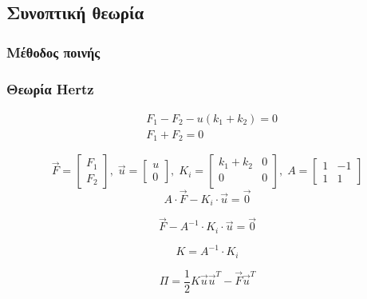 \documentclass{article}
\begin{document}
\subsection{Συνοπτική θεωρία}
\subsubsection{Μέθοδος ποινής}

\subsubsection{Θεωρία Hertz}

\begin{align}
    &F_1-F_2-u(k_1+k_2)=0\\
    &F_1+F_2=0
\end{align}

\begin{equation}
    \vec{F} = \begin{bmatrix}
        F_1\\
        F_2
    \end{bmatrix},\; \vec{u}=\begin{bmatrix}
        u\\
        0
    \end{bmatrix},\; K_i = \begin{bmatrix}
        k_1+k_2 & 0\\
        0 & 0\\
    \end{bmatrix},\; A = 
    \begin{bmatrix}
        1 & -1\\
        1 & 1
    \end{bmatrix}
\end{equation}
\begin{equation}
    A\cdot \vec{F} - K_i \cdot \vec{u} = \vec{0}
\end{equation}

\begin{equation}
    \vec{F} - A^{-1}\cdot K_i \cdot \vec{u} = \vec{0} 
\end{equation}

\begin{equation}
    K = A^{-1}\cdot K_i
\end{equation}

\begin{equation}
    \Pi = \frac{1}{2}K\vec{u} \vec{u}^T - \vec{F} \vec{u}^T
\end{equation}
\end{document}
